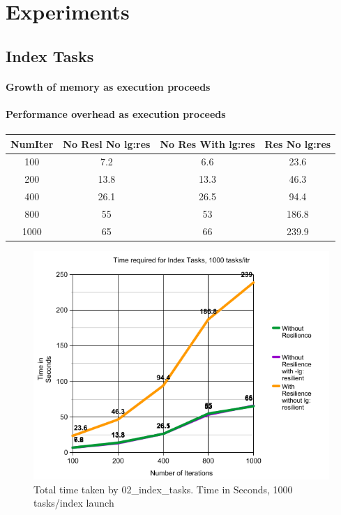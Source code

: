 
\section{Experiments}

\subsection{Index Tasks}

\paragraph{Growth of memory as execution proceeds}
\paragraph{Performance overhead as execution proceeds}



\begin{center}
 \begin{tabular}{||c | c | c | c||} 
 \hline
 NumIter& No Resl No lg:res & No Res With lg:res & Res No lg:res \\ [0.25ex] 
 \hline\hline
100 &  7.2 & 6.6 & 23.6\\ 
 \hline
200 &  13.8 & 13.3 & 46.3\\ 
 \hline
400 &  26.1 & 26.5 & 94.4\\ 
 \hline
800 &  55 & 53 & 186.8\\ 
 \hline
1000 &  65 & 66 & 239.9\\ [1ex] 
 \hline
\end{tabular}
\end{center}

\begin{figure}
\includegraphics[width=\textwidth]{images/index_tasks_time.png}
\caption{Total time taken by 02\_index\_tasks. Time in Seconds, 1000 tasks/index launch }
\end{figure}

